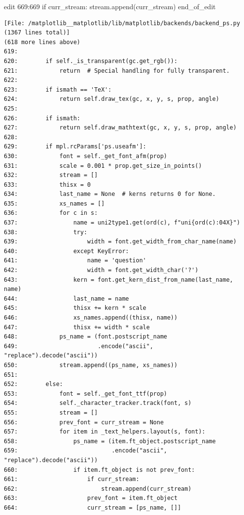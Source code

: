 {\begin{agentbox}
\hrulefill
\begin{CodeVerbatim}[breaklines=true, breakanywhere=true]
edit 669:669
            if curr_stream:
                stream.append(curr_stream)
end_of_edit
\end{CodeVerbatim}
\end{agentbox}
\begin{observationbox}\begin{Verbatim}[breaklines=true, breakanywhere=true]
[File: /matplotlib__matplotlib/lib/matplotlib/backends/backend_ps.py (1367 lines total)]
(618 more lines above)
619:
620:        if self._is_transparent(gc.get_rgb()):
621:            return  # Special handling for fully transparent.
622:
623:        if ismath == 'TeX':
624:            return self.draw_tex(gc, x, y, s, prop, angle)
625:
626:        if ismath:
627:            return self.draw_mathtext(gc, x, y, s, prop, angle)
628:
629:        if mpl.rcParams['ps.useafm']:
630:            font = self._get_font_afm(prop)
631:            scale = 0.001 * prop.get_size_in_points()
632:            stream = []
633:            thisx = 0
634:            last_name = None  # kerns returns 0 for None.
635:            xs_names = []
636:            for c in s:
637:                name = uni2type1.get(ord(c), f"uni{ord(c):04X}")
638:                try:
639:                    width = font.get_width_from_char_name(name)
640:                except KeyError:
641:                    name = 'question'
642:                    width = font.get_width_char('?')
643:                kern = font.get_kern_dist_from_name(last_name, name)
644:                last_name = name
645:                thisx += kern * scale
646:                xs_names.append((thisx, name))
647:                thisx += width * scale
648:            ps_name = (font.postscript_name
649:                       .encode("ascii", "replace").decode("ascii"))
650:            stream.append((ps_name, xs_names))
651:
652:        else:
653:            font = self._get_font_ttf(prop)
654:            self._character_tracker.track(font, s)
655:            stream = []
656:            prev_font = curr_stream = None
657:            for item in _text_helpers.layout(s, font):
658:                ps_name = (item.ft_object.postscript_name
659:                           .encode("ascii", "replace").decode("ascii"))
660:                if item.ft_object is not prev_font:
661:                    if curr_stream:
662:                        stream.append(curr_stream)
663:                    prev_font = item.ft_object
664:                    curr_stream = [ps_name, []]

\end{Verbatim}
\end{observationbox}}

